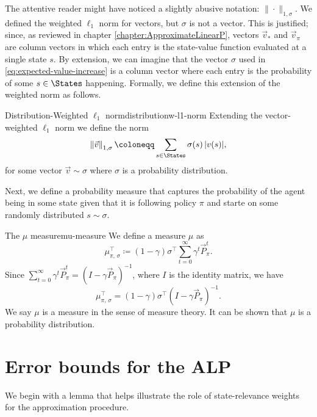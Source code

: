 The attentive reader might have noticed a slightly abusive notation: $\| \cdot
\|_{1, \sigma}$. We defined the weighted $\ell_1$ norm for vectors, but $\sigma$
is not a vector. This is justified; since, as reviewed in chapter
\ref{chapter:ApproximateLinearP}, vectors $\vec{v}_*$ and $\vec{v}_\pi$ are
column vectors in which each entry is the state-value function evaluated at a
single state $s$. By extension, we can imagine that the vector $\sigma$ used in
\eqref{eq:expected-value-increase} is a column vector where each entry is the
probability of some $s \in \States$ happening. Formally, we define this
extension of the weighted norm as follows.

\begin{dfn}{Distribution-Weighted $\ell_1$ norm}{distributionw-l1-norm}
    Extending the vector-weighted $\ell_1$ norm we define the norm
    \[
        \left\| \vec{v} \right\|_{1, \sigma} \coloneqq \sum_{s \in \States} \sigma(s) \, |v(s)|,
    \]
    for some vector $\vec{v} \sim \sigma$ where $\sigma$ is a probability
    distribution.
\end{dfn}

Next, we define a probability measure that captures the probability of the agent
being in some state given that it is following policy $\pi$ and starte on some
randomly distributed $s \sim \sigma$.

\begin{dfn}{The $\mu$ measure}{mu-measure}
    We define a measure $\mu$ as
    \[
        \mu_{\pi, \, \sigma}^{\top} \coloneqq (1 - \gamma) \sigma^{\top} \sum_{t=0}^{\infty} \gamma^{t} \vec{P}_{\pi}^{t}.
    \]
    Since $\sum_{t=0}^{\infty} \gamma^{t} \vec{P}_{\pi}^{t} = (I - \gamma
    \vec{P}_\pi)^{-1}$, where $I$ is the identity matrix, we have
    \[
        \mu_{\pi, \, \sigma}^{\top} = (1 - \gamma) \sigma^{\top} (I - \gamma \vec{P}_{\pi})^{-1}.
    \]
    We say $\mu$ is a measure in the sense of measure theory. It can be shown
    \Cite[pg.~864]{farias2003LP2ADP} that $\mu$ is a probability distribution.
\end{dfn}

\section{Error bounds for the ALP}

We begin with a lemma that helps illustrate the role of state-relevance weights
for the approximation procedure.

